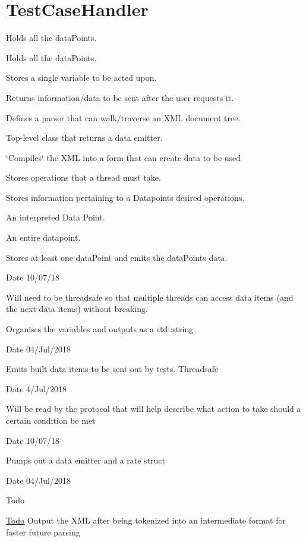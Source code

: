 \hypertarget{group__testCaseHandler}{}\section{Test\+Case\+Handler}
\label{group__testCaseHandler}


Holds all the data\+Points.  


Holds all the data\+Points. 

Stores a single variable to be acted upon.

Returns information/data to be sent after the user requests it.

Defines a parser that can walk/traverse an X\+ML document tree.

Top-\/level class that returns a data emitter.

\char`\"{}\+Compiles\char`\"{} the X\+ML into a form that can create data to be used

Stores operations that a thread must take.

Stores information pertaining to a Datapoints desired operations.

An interpreted Data Point.

An entire datapoint.

Stores at least one data\+Point and emits the data\+Points data.

\begin{DoxyDate}{Date}
10/07/18
\end{DoxyDate}
Will need to be threadsafe so that multiple threads can access data items (and the next data items) without breaking.

Organises the variables and outputs as a std\+::string

\begin{DoxyDate}{Date}
04/\+Jul/2018
\end{DoxyDate}
Emits built data items to be sent out by tests. Threadsafe

\begin{DoxyDate}{Date}
4/\+Jul/2018
\end{DoxyDate}
Will be read by the protocol that will help describe what action to take should a certain condition be met

\begin{DoxyDate}{Date}
10/07/18
\end{DoxyDate}
Pumps out a data emitter and a rate struct

\begin{DoxyDate}{Date}
04/\+Jul/2018
\end{DoxyDate}
\begin{DoxyRefDesc}{Todo}
\item[\mbox{\hyperlink{todo__todo000032}{Todo}}]Output the X\+ML after being tokenized into an intermediate format for faster future parsing\end{DoxyRefDesc}


